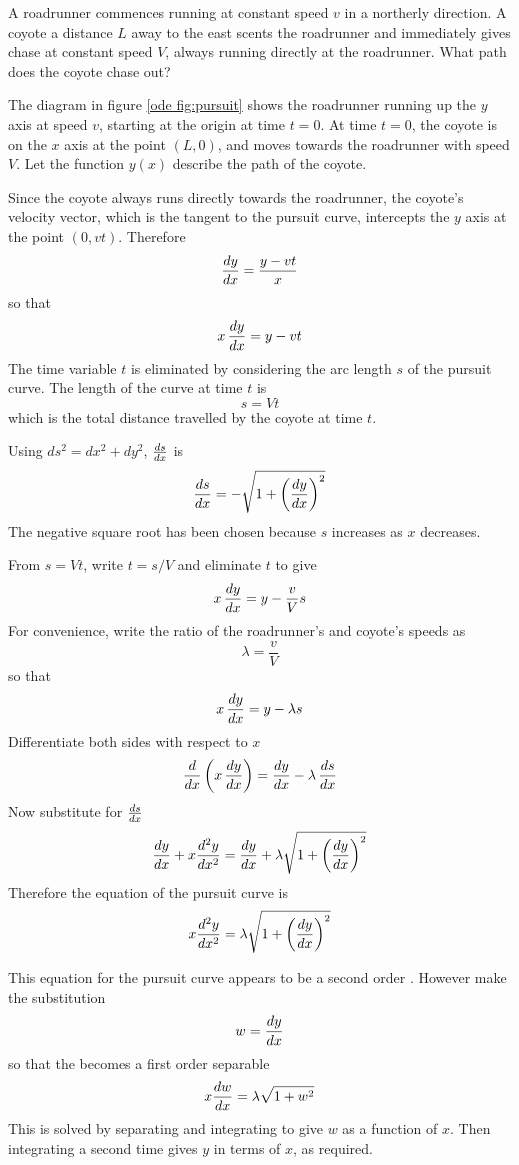 \begin{example}
\label{ode exam:pursuit}
\problem A roadrunner commences running at constant speed $v$ in a northerly
direction.  A coyote a distance $L$ away to the east scents the roadrunner
and immediately gives chase at constant speed $V$, always running directly
at the roadrunner.  What path does the coyote chase out?

\solution
The diagram in figure \ref{ode fig:pursuit} shows the roadrunner running up
the $y$ axis at speed $v$, starting at the origin at time $t=0$.  At time
$t=0$, the coyote is on the $x$ axis at the point $(L,0)$, and moves towards
the roadrunner with speed $V$.  Let the function $y(x)$ describe the path of
the coyote.

Since the coyote always runs directly towards the roadrunner, the coyote's
velocity vector, which is the tangent to the pursuit curve, intercepts the
$y$ axis at the point $(0,vt)$.  Therefore
$$\frac{dy}{dx}=\frac{y-vt}{x}$$
so that
$$x\,\frac{dy}{dx}=y-vt$$
The time variable $t$ is eliminated by considering the arc length $s$ of the
pursuit curve.  The length of the curve at time $t$ is
$$s=Vt$$
which is the total distance travelled by the coyote at time $t$.

Using $ds^2=dx^2+dy^2$, $\frac{ds}{dx}$ is
$$\frac{ds}{dx}=-\sqrt{1+\left(\frac{dy}{dx}\right)^2}$$
The negative square root has been chosen because $s$ increases as $x$
decreases.

From $s=Vt$, write $t=s/V$ and eliminate $t$ to give
$$x\,\frac{dy}{dx}=y-\frac{v}{V}s$$
For convenience, write the ratio of the roadrunner's and coyote's speeds as
$$\lambda=\frac{v}{V}$$
so that
$$x\,\frac{dy}{dx}=y-\lambda s$$
Differentiate both sides with respect to $x$ 
$$\frac{d}{d{x}}\left(x\,\frac{dy}{dx}\right)=\frac{dy}{dx}-\lambda\,\frac{ds}{dx}$$
Now substitute for $\frac{ds}{dx}$
$$\frac{dy}{dx}+x\frac{d^2y}{d{x}^2}=\frac{dy}{dx}+
\lambda\sqrt{1+\left(\frac{dy}{dx}\right)^2}$$
Therefore the equation of the pursuit curve is 
$$x\frac{d^2y}{d{x}^2}=\lambda\sqrt{1+\left(\frac{dy}{dx}\right)^2}$$


This equation for the pursuit curve appears to be a second order \ODE.  
However make the substitution 
$$w=\frac{dy}{dx}$$
so that the \ODE becomes a first order separable \ODE
$$x\frac{dw}{dx}=\lambda\sqrt{1+w^2}$$
This is solved by separating and integrating to give $w$ as a function of 
$x$.  Then integrating a second time gives $y$ in terms of $x$, as required.


\end{example}
